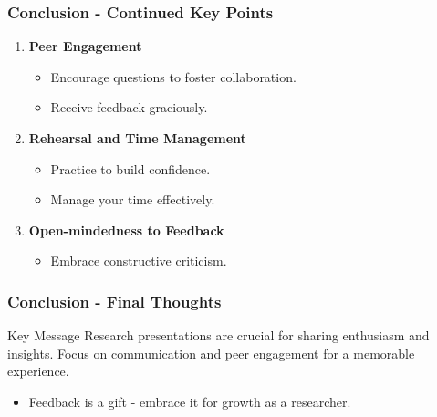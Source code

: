 \documentclass[aspectratio=169]{beamer}
\begin{document}
\begin{frame}[fragile]
    \frametitle{Conclusion - Continued Key Points}
    \begin{enumerate}[resume]
        \item \textbf{Peer Engagement}
        \begin{itemize}
            \item Encourage questions to foster collaboration.
            \item Receive feedback graciously.
        \end{itemize}
        
        \item \textbf{Rehearsal and Time Management}
        \begin{itemize}
            \item Practice to build confidence.
            \item Manage your time effectively.
        \end{itemize}
        
        \item \textbf{Open-mindedness to Feedback}
        \begin{itemize}
            \item Embrace constructive criticism.
        \end{itemize}
    \end{enumerate}
\end{frame}

\begin{frame}[fragile]
    \frametitle{Conclusion - Final Thoughts}
    \begin{block}{Key Message}
        Research presentations are crucial for sharing enthusiasm and insights. Focus on communication and peer engagement for a memorable experience.
    \end{block}
    \begin{itemize}
        \item Feedback is a gift - embrace it for growth as a researcher.
    \end{itemize}
\end{frame}
\end{document}
